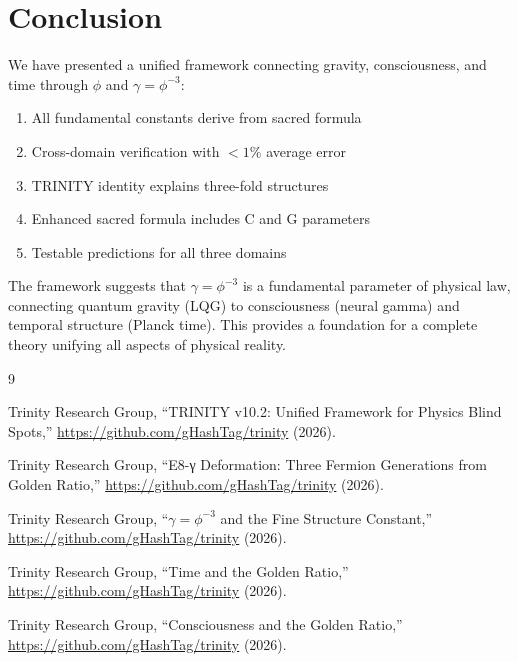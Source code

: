 \documentclass[12pt,a4paper]{article}
\begin{document}
\section{Conclusion}

We have presented a unified framework connecting gravity, consciousness, and time through $\phi$ and $\gamma = \phi^{-3}$:

\begin{enumerate}
\item All fundamental constants derive from sacred formula
\item Cross-domain verification with $< 1\%$ average error
\item TRINITY identity explains three-fold structures
\item Enhanced sacred formula includes C and G parameters
\item Testable predictions for all three domains
\end{enumerate}

The framework suggests that $\gamma = \phi^{-3}$ is a fundamental parameter of physical law, connecting quantum gravity (LQG) to consciousness (neural gamma) and temporal structure (Planck time). This provides a foundation for a complete theory unifying all aspects of physical reality.

\begin{thebibliography}{9}

Trinity Research Group,
``TRINITY v10.2: Unified Framework for Physics Blind Spots,''
\url{https://github.com/gHashTag/trinity} (2026).

Trinity Research Group,
``E8-γ Deformation: Three Fermion Generations from Golden Ratio,''
\url{https://github.com/gHashTag/trinity} (2026).

Trinity Research Group,
``$\gamma = \phi^{-3}$ and the Fine Structure Constant,''
\url{https://github.com/gHashTag/trinity} (2026).

Trinity Research Group,
``Time and the Golden Ratio,''
\url{https://github.com/gHashTag/trinity} (2026).

Trinity Research Group,
``Consciousness and the Golden Ratio,''
\url{https://github.com/gHashTag/trinity} (2026).

\end{thebibliography}
\end{document}
